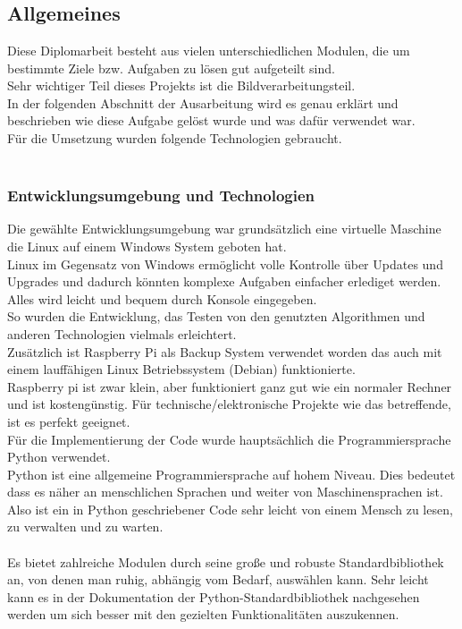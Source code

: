 \chapter{\docname}
\label{\docname}

\section{Allgemeines}


Diese Diplomarbeit besteht aus vielen unterschiedlichen Modulen, die um bestimmte Ziele bzw. Aufgaben zu lösen gut aufgeteilt sind.\\
Sehr wichtiger Teil dieses Projekts ist die Bildverarbeitungsteil.\\
In der folgenden Abschnitt der Ausarbeitung wird es genau erklärt und beschrieben wie diese Aufgabe gelöst wurde und was dafür verwendet war.\\ 
Für die Umsetzung wurden folgende Technologien gebraucht. \\
\\
\subsection{Entwicklungsumgebung und Technologien}

Die gewählte Entwicklungsumgebung war grundsätzlich eine virtuelle Maschine die Linux auf einem Windows System geboten hat. \\
Linux im Gegensatz von Windows ermöglicht volle Kontrolle über Updates und Upgrades und dadurch könnten komplexe Aufgaben einfacher erlediget werden.\\ Alles wird leicht und bequem durch Konsole eingegeben. \\
So wurden die Entwicklung, das Testen von den genutzten Algorithmen und anderen Technologien vielmals erleichtert. \cite{linx}\\

Zusätzlich ist Raspberry Pi als Backup System verwendet worden das auch mit einem lauffähigen Linux Betriebssystem (Debian) funktionierte. \\
Raspberry pi ist zwar klein, aber funktioniert ganz gut wie ein normaler Rechner und ist  kostengünstig. Für technische/elektronische Projekte wie das betreffende, ist es perfekt geeignet. \\ 
Für die Implementierung der Code wurde hauptsächlich die Programmiersprache Python verwendet. \\
Python ist eine allgemeine Programmiersprache auf hohem Niveau. Dies bedeutet dass es näher an menschlichen Sprachen und weiter von Maschinensprachen ist. \\
Also ist ein in Python geschriebener Code sehr leicht von einem Mensch zu lesen, zu verwalten und zu warten.  \\ 
\\
Es bietet zahlreiche Modulen durch seine große und robuste Standardbibliothek an, von denen man ruhig, abhängig vom Bedarf, auswählen kann.  
Sehr leicht kann es in der Dokumentation der Python-Standardbibliothek nachgesehen werden um sich besser mit den gezielten Funktionalitäten auszukennen. \\ \cite{why_python}

